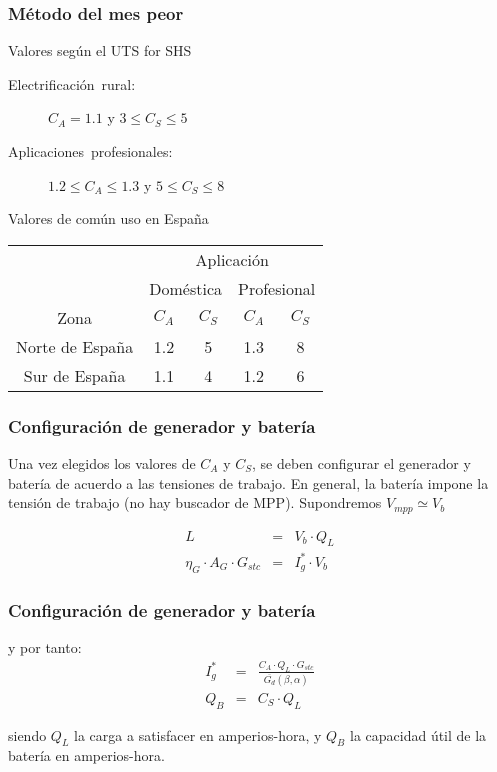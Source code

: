 \documentclass[serif, xcolor=dvipsnames]{beamer}
\begin{document}
\begin{frame}
\frametitle{Método del mes peor}
\begin{block}
{Valores según el UTS for SHS}
\begin{description}
\item [{Electrificación~rural:}] $C_{A}=1.1$ y $3\leq C_{S}\leq5$
\item [{Aplicaciones~profesionales:}] $1.2\leq C_{A}\leq1.3$ y $5\leq C_{S}\leq8$
\end{description}
\end{block}
{}
\begin{block}
{Valores de común uso en España}

\begin{center}
\begin{tabular}{ccccc}
\toprule 
 & \multicolumn{4}{c}{Aplicación}\tabularnewline
\cmidrule{2-5} 
 & \multicolumn{2}{c}{Doméstica} & \multicolumn{2}{c}{Profesional}\tabularnewline
\midrule
\midrule 
Zona & $C_{A}$ & $C_{S}$ & $C_{A}$ & $C_{S}$\tabularnewline
\midrule 
Norte de España & 1.2 & 5 & 1.3 & 8\tabularnewline
\midrule 
Sur de España & 1.1 & 4 & 1.2 & 6\tabularnewline
\bottomrule
\end{tabular}
\par\end{center}

\end{block}

\end{frame}

\begin{frame}
\frametitle{Configuración de generador y batería}

Una vez elegidos los valores de $C_{A}$ y $C_{S}$, se deben configurar
el generador y batería de acuerdo a las tensiones de trabajo. En general,
la batería impone la tensión de trabajo (no hay buscador de MPP).
Supondremos $V_{mpp}\simeq V_{b}$

\begin{eqnarray*}
L & = & V_{b}\cdot Q_{L}\\
\eta_{G}\cdot A_{G}\cdot G_{stc} & = & I_{g}^{*}\cdot V_{b}\end{eqnarray*}



\end{frame}

\begin{frame}
\frametitle{Configuración de generador y batería}

y por tanto:\begin{eqnarray*}
I_{g}^{*} & = & \frac{C_{A}\cdot Q_{L}\cdot G_{stc}}{\overline{G_{d}}(\beta,\alpha)}\\
Q_{B} & = & C_{S}\cdot Q_{L}\end{eqnarray*}


siendo $Q_{L}$ la carga a satisfacer en amperios-hora, y $Q_{B}$
la capacidad útil de la batería en amperios-hora.


\end{frame}
\end{document}

